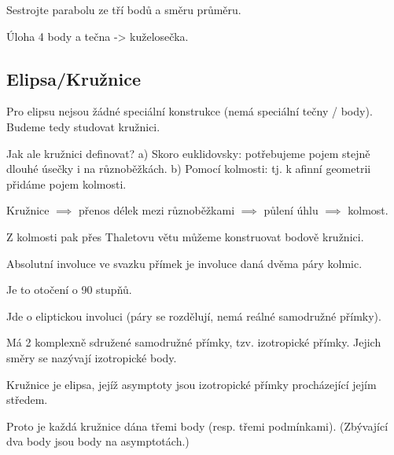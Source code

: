 \documentclass[12pt]{article}					%
\begin{document}
\begin{priklad}
	Sestrojte parabolu ze tří bodů a směru průměru.

	\begin{reseni}
		Úloha 4 body a tečna -> kuželosečka.
	\end{reseni}
\end{priklad}

\subsection{Elipsa/Kružnice}
\begin{poznamka}
	Pro elipsu nejsou žádné speciální konstrukce (nemá speciální tečny / body). Budeme tedy studovat kružnici.

	Jak ale kružnici definovat? a) Skoro euklidovsky: potřebujeme pojem stejně dlouhé úsečky i na různoběžkách. b) Pomocí kolmosti: tj. k afinní geometrii přidáme pojem kolmosti.
\end{poznamka}

\begin{poznamka}
	Kružnice $\implies$ přenos délek mezi různoběžkami $\implies$ půlení úhlu $\implies$ kolmost.

	Z kolmosti pak přes Thaletovu větu můžeme konstruovat bodově kružnici.
\end{poznamka}

\begin{definice}
	Absolutní involuce ve svazku přímek je involuce daná dvěma páry kolmic.

	\begin{poznamkain}
		Je to otočení o 90 stupňů.
	\end{poznamkain}

	\begin{poznamkain}[Pozorování]
		Jde o eliptickou involuci (páry se rozdělují, nemá reálné samodružné přímky).

		Má 2 komplexně sdružené samodružné přímky, tzv. izotropické přímky. Jejich směry se nazývají izotropické body.
	\end{poznamkain}
\end{definice}

\begin{definice}
	Kružnice je elipsa, jejíž asymptoty jsou izotropické přímky procházející jejím středem.
\end{definice}

\begin{dusledek}
	Proto je každá kružnice dána třemi body (resp. třemi podmínkami). (Zbývající dva body jsou body na asymptotách.)
\end{dusledek}
\end{document}
